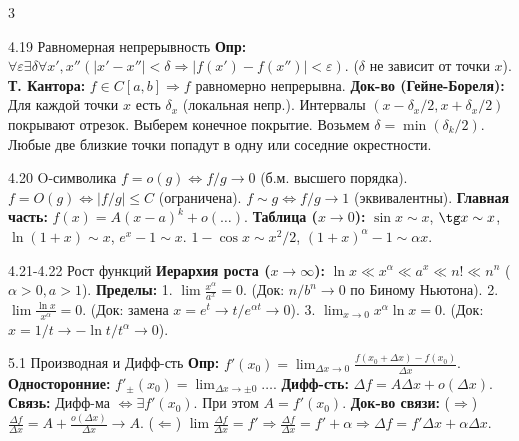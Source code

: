 \documentclass[8pt, a4paper, landscape]{extarticle}
\newcommand{\Ra}{\Rightarrow}
\newcommand{\eps}{\varepsilon}
\begin{document}
\begin{multicols*}{3}
\begin{ticket}{4.19 Равномерная непрерывность}
\textbf{Опр:} $\forall \eps \exists \delta \forall x', x'' (|x'-x''|<\delta \Ra |f(x')-f(x'')|<\eps)$.
($\delta$ не зависит от точки $x$).
\textbf{Т. Кантора:} $f \in C[a, b] \Ra f$ равномерно непрерывна.
\tcblower
\textbf{Док-во (Гейне-Бореля):}
Для каждой точки $x$ есть $\delta_x$ (локальная непр.).
Интервалы $(x-\delta_x/2, x+\delta_x/2)$ покрывают отрезок.
Выберем конечное покрытие.
Возьмем $\delta = \min (\delta_k/2)$.
Любые две близкие точки попадут в одну или соседние окрестности.
\end{ticket}

\begin{ticket}{4.20 O-символика}
$f = o(g) \iff f/g \to 0$ (б.м. высшего порядка).
$f = O(g) \iff |f/g| \le C$ (ограничена).
$f \sim g \iff f/g \to 1$ (эквивалентны).
\textbf{Главная часть:} $f(x) = A(x-a)^k + o(\dots)$.
\textbf{Таблица ($x \to 0$):}
$\sin x \sim x$, $\tg x \sim x$, $\ln(1+x) \sim x$, $e^x-1 \sim x$.
$1-\cos x \sim x^2/2$, $(1+x)^\alpha - 1 \sim \alpha x$.
\end{ticket}

\begin{ticket}{4.21-4.22 Рост функций}
\textbf{Иерархия роста ($x \to \infty$):}
$\ln x \ll x^\alpha \ll a^x \ll n! \ll n^n$ ($\alpha > 0, a > 1$).
\textbf{Пределы:}
1. $\lim \frac{x^\alpha}{a^x} = 0$. (Док: $n/b^n \to 0$ по Биному Ньютона).
2. $\lim \frac{\ln x}{x^\alpha} = 0$. (Док: замена $x=e^t \to t/e^{\alpha t} \to 0$).
3. $\lim_{x\to 0} x^\alpha \ln x = 0$. (Док: $x=1/t \to -\ln t / t^\alpha \to 0$).
\end{ticket}



\begin{ticket}{5.1 Производная и Дифф-сть}
\textbf{Опр:} $f'(x_0) = \lim_{\Delta x \to 0} \frac{f(x_0+\Delta x) - f(x_0)}{\Delta x}$.
\textbf{Односторонние:} $f'_{\pm}(x_0) = \lim_{\Delta x \to \pm 0} \dots$.
\textbf{Дифф-сть:} $\Delta f = A \Delta x + o(\Delta x)$.
\textbf{Связь:} Дифф-ма $\iff \exists f'(x_0)$. При этом $A = f'(x_0)$.
\tcblower
\textbf{Док-во связи:}
($\Ra$) $\frac{\Delta f}{\Delta x} = A + \frac{o(\Delta x)}{\Delta x} \to A$.
($\Leftarrow$) $\lim \frac{\Delta f}{\Delta x} = f' \Ra \frac{\Delta f}{\Delta x} = f' + \alpha \Ra \Delta f = f'\Delta x + \alpha \Delta x$.
\end{ticket}


\end{multicols*}
\end{document}
